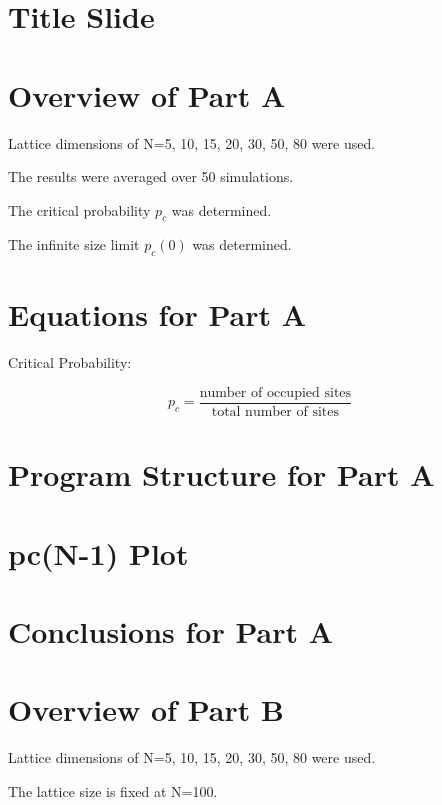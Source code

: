 \documentclass[12pt]{article}
\begin{document}
\section{Title Slide}

\section{Overview of Part A}
\noindent Lattice dimensions of N=5, 10, 15, 20, 30, 50, 80 were used. \newline

\noindent The results were averaged over 50 simulations. \newline

\noindent The critical probability $p_c$ was determined. \newline

\noindent The infinite size limit $p_c(0)$ was determined. 

\section{Equations for Part A}

\noindent Critical Probability:

\begin{equation}
p_c=\frac{\text{number of occupied sites}}{\text{total number of sites}}
\end{equation}

\section{Program Structure for Part A}

\section{pc(N-1) Plot}

\section{Conclusions for Part A}

\section{Overview of Part B}
\noindent Lattice dimensions of N=5, 10, 15, 20, 30, 50, 80 were used. \newline

\noindent The lattice size is fixed at N=100. \newline
\end{document}
